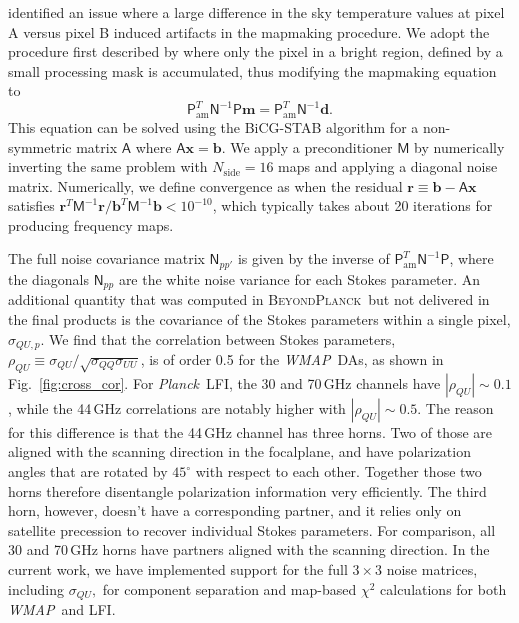 \documentclass[twocolumn]{../../common/aa}
\def\WMAP{\emph{WMAP}}
\def\Planck{\emph{Planck}}
\newcommand{\bp}{\textsc{BeyondPlanck}}
\begin{document}
\citet{jarosik2010} identified an issue where a large difference in the sky temperature values at pixel A versus pixel B induced artifacts in the mapmaking procedure. We adopt the procedure first described by \citet{hinshaw2003a} where only the pixel in a bright region, defined by a small processing mask \citep{bennett2012} is accumulated, thus modifying the mapmaking equation to
\begin{equation}
	\mathsf P^T_\mathrm{am}\mathsf N^{-1}\mathsf P\boldsymbol m
	=\mathsf P^T_\mathrm{am}\mathsf N^{-1}\boldsymbol d.
	\label{eq:bicg_stab}
\end{equation}
This equation can be solved using the BiCG-STAB algorithm for a non-symmetric matrix $\mathsf A$ where $\mathsf A\boldsymbol x=\boldsymbol b$. We apply a preconditioner $\mathsf M$ by numerically inverting the same problem with $N_\mathrm{side}=16$ maps and applying a diagonal noise matrix. Numerically, we define convergence as when the residual $\boldsymbol r\equiv\boldsymbol b-\mathsf A\boldsymbol x$ satisfies $\boldsymbol r^T\mathsf M^{-1}\boldsymbol r/\boldsymbol b^T\mathsf M^{-1}\boldsymbol b<10^{-10}$, which typically takes about 20 iterations for producing frequency maps.

The full noise covariance matrix $\mathsf N_{pp'}$ is given by the inverse of $\mathsf P^T_\mathrm{am}\mathsf N^{-1}\mathsf P$, where the diagonals $\mathsf N_{pp}$ are the white noise variance for each Stokes parameter. An additional quantity that was computed in \bp\ but not delivered in the final products is the covariance of the Stokes parameters within a single pixel, $\sigma_{QU,p}$. We find that the correlation between Stokes parameters, $\rho_{QU}\equiv\sigma_{QU}/\sqrt{\sigma_{QQ}\sigma_{UU}}$, is of order 0.5 for the \WMAP\ DAs, as shown in Fig.~\ref{fig:cross_cor}. For \Planck\ LFI, the 30 and 70\,GHz channels have $|\rho_{QU}|\sim0.1$, while the 44\,GHz correlations are notably higher with $|\rho_{QU}|\sim0.5$. The reason for this difference is that the 44\,GHz channel has three horns. Two of those are aligned with the scanning direction in the focalplane, and have polarization angles that are rotated by $45^{\circ}$ with respect to each other. Together those two horns therefore disentangle polarization information very efficiently. The third horn, however, doesn't have a corresponding partner, and it relies only on satellite precession to recover individual Stokes parameters. For comparison, all 30 and 70\,GHz horns have partners aligned with the scanning direction. In the current work, we have implemented support for the full $3\times 3$ noise matrices, including $\sigma_{QU},$ for component separation and map-based $\chi^2$ calculations for both \WMAP\ and LFI.
\end{document}
